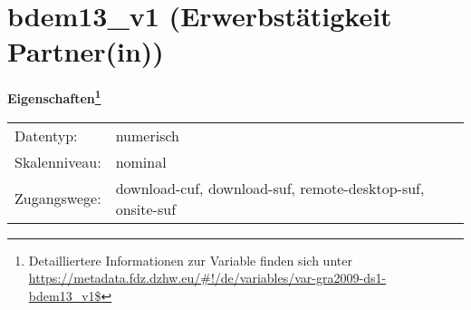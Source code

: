 
    \setcounter{footnote}{0}

    \vspace*{-1.8cm}
	\section{bdem13\_v1 (Erwerbstätigkeit Partner(in))}
	\label{section:bdem13_v1}



    \vspace*{0.5cm}
    \noindent\textbf{Eigenschaften\footnote{Detailliertere Informationen zur Variable finden sich unter
		\url{https://metadata.fdz.dzhw.eu/\#!/de/variables/var-gra2009-ds1-bdem13_v1$}}}\\
	\begin{tabularx}{\hsize}{@{}lX}
	Datentyp: & numerisch \\
	Skalenniveau: & nominal \\
	Zugangswege: &
	  download-cuf, 
	  download-suf, 
	  remote-desktop-suf, 
	  onsite-suf
 \\
    \end{tabularx}



